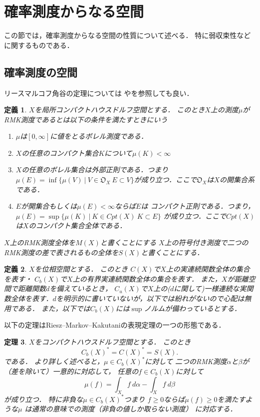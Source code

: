 \documentclass[leqno, a4paper, 12pt]{jsarticle}
\newtheorem{thm}{定理}
\newtheorem{df}[thm]{定義}
\begin{document}
\section{確率測度からなる空間}
この節では，確率測度からなる空間の性質について述べる．
特に弱収束性などに関するものである．


\subsection{確率測度の空間}


リースマルコフ角谷の定理については
\cite{RMK1}や\cite{RMK2}を参照しても良い．
\begin{df}
$X$を局所コンパクトハウスドルフ空間とする．
このとき$X$上の測度$\mu$がRMK測度であるとは以下の条件を満たすときにいう
\begin{enumerate}
\item $\mu$は$[0, \infty]$に値をとるボレル測度である．
\item $X$の任意のコンパクト集合$K$について$\mu(K)<\infty$
\item $X$の任意のボレル集合は外部正則である．つまり
$\mu(E)=\inf\{\mu(V)\ |\ V\in \mathfrak{O}_X\ E\subset V\}$が成り立つ．ここで$\mathfrak{O}_X$は$X$の開集合系である．
\item $E$が開集合もしくは$\mu(E)<\infty$ならば$E$は
コンパクト正則である．つまり，
$\mu(E)=\sup\{\mu(K)\ |\ K\in Cpt(X) \ K\subset E\}$
が成り立つ．ここで$Cpt(X)$は$X$のコンパクト集合全体である．
\end{enumerate}

$X$上のRMK測度全体を$M(X)$と書くことにする
$X$上の符号付き測度で二つのRMK測度の差で表されるもの全体を$S(X)$と書くことにする．
\end{df}


\begin{df}
$X$を位相空間とする．
このとき
$C(X)$で$X$上の実連続関数全体の集合を表す・
$C_{b}(X)$で$X$上の有界実連続関数全体の集合を表す．
また，$X$が距離空間で距離関数$d$を備えているとき，
$C_{u}(X)$で$X$上の($d$に関して)一様連続な実関数全体を表す．$d$を明示的に書いていないが，以下では紛れがないので心配は無用である．
また，以下では$C_{b}(X)$には$\sup$ノルムが備わっているとする．
\end{df}

以下の定理はRiesz--Markov--Kakutaniの表現定理の一つの形態である．
\begin{thm}\label{thm:rmkdual}
$X$をコンパクトハウスドルフ空間とする．
このとき
\[
C_b(X)^*=C(X)^*=S(X). 
\]
である．
より詳しく述べると，$\mu\in C_{b}(X)^{*}$に対して
二つのRMK測度$\alpha$と$\beta$が（差を除いて）一意的に対応して，
任意の$f\in C_{b}(X)$に対して
\[
\mu(f)=\int_{X}f \ d\alpha -\int_{X}f\ d\beta
\]
が成り立つ．
特に非負な$\mu\in C_{b}(X)^{*}$つまり
$f\ge 0$ならば$\mu(f)\ge 0$を満たすような$\mu$
は通常の意味での測度（非負の値しか取らない測度）
に対応する．
\end{thm}
\end{document}
